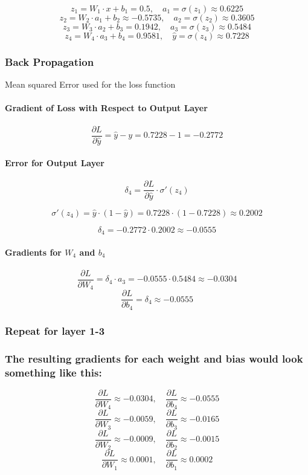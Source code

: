 \documentclass{article}
\begin{document}
\[
z_1 = W_1 \cdot x + b_1 = 0.5, \quad a_1 = \sigma(z_1) \approx 0.6225
\]
\[
z_2 = W_2 \cdot a_1 + b_2 \approx -0.5735, \quad a_2 = \sigma(z_2) \approx 0.3605
\]
\[
z_3 = W_3 \cdot a_2 + b_3 = 0.1942, \quad a_3 = \sigma(z_3) \approx 0.5484
\]
\[
z_4 = W_4 \cdot a_3 + b_4 = 0.9581, \quad \hat{y} = \sigma(z_4) \approx 0.7228
\]

\subsubsection{Back Propagation} Mean squared Error used for the loss function


\paragraph{Gradient of Loss with Respect to Output Layer}

\[
\frac{\partial L}{\partial \hat{y}} = \hat{y} - y = 0.7228 - 1 = -0.2772
\]

\paragraph{Error for Output Layer}
\[
\delta_4 = \frac{\partial L}{\partial \hat{y}} \cdot \sigma'(z_4)
\]

\[
\sigma'(z_4) = \hat{y} \cdot (1 - \hat{y}) = 0.7228 \cdot (1 - 0.7228) \approx 0.2002
\]

\[
\delta_4 = -0.2772 \cdot 0.2002 \approx -0.0555
\]

\paragraph{Gradients for \( W_4 \) and \( b_4 \)}
\[
\frac{\partial L}{\partial W_4} = \delta_4 \cdot a_3 = -0.0555 \cdot 0.5484 \approx -0.0304
\]
\[
\frac{\partial L}{\partial b_4} = \delta_4 \approx -0.0555
\]


\subsubsection{Repeat for layer 1-3}


\subsubsection{The resulting gradients for each weight and bias would look something like this:}
\[
\frac{\partial L}{\partial W_4} \approx -0.0304, \quad \frac{\partial L}{\partial b_4} \approx -0.0555
\]
\[
\frac{\partial L}{\partial W_3} \approx -0.0059, \quad \frac{\partial L}{\partial b_3} \approx -0.0165
\]
\[
\frac{\partial L}{\partial W_2} \approx -0.0009, \quad \frac{\partial L}{\partial b_2} \approx -0.0015
\]
\[
\frac{\partial L}{\partial W_1} \approx 0.0001, \quad \frac{\partial L}{\partial b_1} \approx 0.0002
\]
\end{document}
